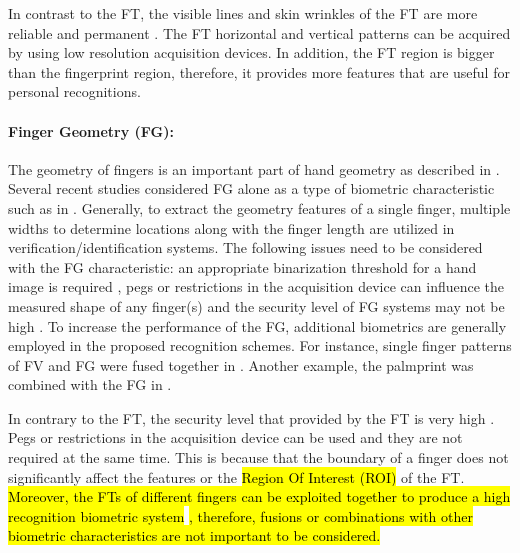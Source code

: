 \documentclass[review]{elsarticle}
\begin{document}
	In contrast to the FT, the visible lines and skin wrinkles of the FT are more reliable and permanent \cite{Al-Nima2017Signal}. The FT horizontal and vertical patterns can be acquired by using low resolution acquisition devices. In addition, the FT region is bigger than the fingerprint region, therefore, it provides more features that are useful for personal recognitions. 
	\paragraph{\textbf{Finger Geometry (FG):}} The geometry of fingers is an important part of hand geometry as described in \cite{Sanchez-Reillo2000Biometric,Ayurzana2013Astudy,Svoboda2015Contactless}. Several recent studies considered FG alone as a type of biometric characteristic such as in \cite{Malassiotis2006Personal,Aghili2010Personal,Liu2015Hand}. Generally, to extract the geometry features of a single finger, multiple widths to determine locations along with the finger length are utilized in verification/identification systems. 
	The following issues need to be considered with the FG characteristic: an appropriate binarization threshold for a hand image is required \cite{Kang2014Pose}, pegs or restrictions in the acquisition device can influence the measured shape of any finger(s) and the security level of FG systems may not be high \cite{Aghili2010Personal}. To increase the performance of the FG, additional biometrics are generally employed in the proposed recognition schemes. For instance, single finger patterns of FV and FG were fused together in \cite{Kang2010Multimodal}. Another example, the palmprint was combined with the FG in \cite{Yu2010Feature,Joshi2014Enhancing,Anitha2014Anovel}. 
	
	In contrary to the FT, the security level that provided by the FT is very high \cite{Ribaric2005ABiometric,Al-Nima2017Robust,Al-Nima2017Signal}. Pegs or restrictions in the acquisition device can be used and they are not required at the same time. This is because that the boundary of a finger does not significantly affect the features or the \hl{Region Of Interest (ROI)} of the FT. \hl{Moreover, the FTs of different fingers can be exploited together to produce a high recognition biometric system} \cite{Al-Nima2017Robust,Al-Nima2017finger, Al-Nima2017Signal}\hl{, therefore, fusions or combinations with other biometric characteristics are not important to be considered.} 
\end{document}
